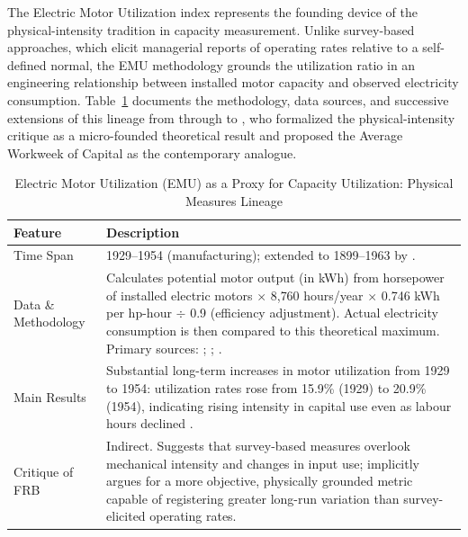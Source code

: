 

The Electric Motor Utilization index represents the founding device of the
physical-intensity tradition in capacity measurement. Unlike survey-based
approaches, which elicit managerial reports of operating rates relative to a
self-defined normal, the EMU methodology grounds the utilization ratio in an
engineering relationship between installed motor capacity and observed
electricity consumption. Table~\ref{tab:EMU_proxy_CU} documents the
methodology, data sources, and successive extensions of this lineage from
\citet{Foss1963} through \citet{Shaikh1992,Shaikh2016} to
\citet{Nikiforos2016}, who formalized the physical-intensity critique as a
micro-founded theoretical result and proposed the Average Workweek of Capital
as the contemporary analogue.

\begin{table}[!h]
	\centering
	\caption{Electric Motor Utilization (EMU) as a Proxy for Capacity
		Utilization: Physical Measures Lineage}
	\label{tab:EMU_proxy_CU}
	\small
	\begin{tabular}{p{3.2cm} p{10.5cm}}
		\toprule
		Feature & Description \\
		\midrule
		
		Time Span &
		1929--1954 (manufacturing); extended to 1899--1963 by
		\citet{Shaikh1992}. \\[4pt]
		
		Data \& Methodology &
		Calculates potential motor output (in kWh) from horsepower of
		installed electric motors $\times$ 8{,}760 hours/year $\times$
		0.746 kWh per hp-hour $\div$ 0.9 (efficiency adjustment). Actual
		electricity consumption is then compared to this theoretical
		maximum. Primary sources: \citet{USfpc1945};
		\citet{UScensus1966,UScensus1967,UScensus1975};
		\citet{USdc1986}. \\[4pt]
		
		Main Results &
		Substantial long-term increases in motor utilization from 1929 to
		1954: utilization rates rose from 15.9\% (1929) to 20.9\% (1954),
		indicating rising intensity in capital use even as labour hours
		declined \citep{Foss1963}. \\[4pt]
		
		Critique of FRB &
		Indirect. Suggests that survey-based measures overlook mechanical
		intensity and changes in input use; implicitly argues for a more
		objective, physically grounded metric capable of registering
		greater long-run variation than survey-elicited operating rates. \\[4pt]
		

\end{tabular}
\end{table}
